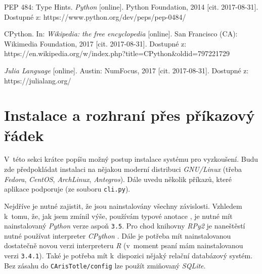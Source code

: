 \documentclass[a4paper,twoside,12pt]{scrbook}
\begin{document}
\begin{thebibliography}{99}
	 PEP 484: Type Hints. \textit{Python} [online]. Python Foundation, 2014 [cit. 2017-08-31]. Dostupné z: https://www.python.org/dev/peps/pep-0484/

	 CPython. In: \textit{Wikipedia: the free encyclopedia} [online]. San Francisco (CA): Wikimedia Foundation, 2017 [cit. 2017-08-31]. Dostupné z: https://en.wikipedia.org/w/index.php?title=CPython\&oldid=797221729

	 \textit{Julia Language} [online]. Austin: NumFocus, 2017 [cit. 2017-08-31]. Dostupné z: https://julialang.org/

\end{thebibliography}


\newpage %
\appendix %



\section*{Instalace a rozhraní přes příkazový řádek}
\label{appendix:installation}

V~této sekci krátce popíšu možný postup instalace systému pro vyzkoušení. Budu zde předpokládat instalaci na nějakou moderní distribuci \textit{GNU/Linux} (třeba \textit{Fedora}, \textit{CentOS}, \textit{ArchLinux}, \textit{Antegros}). Dále uvedu několik příkazů, které aplikace podporuje (ze souboru \texttt{cli.py}).

Nejdříve je nutné zajistit, že jsou nainstalovány všechny závislosti. Vzhledem k~tomu, že, jak jsem zmínil výše, používám typové anotace \cite{PEP484}, je nutné mít nainstalovaný \textit{Python} verze aspoň \texttt{3.5}. Pro chod knihovny \textit{RPy2} je naneštěstí nutné používat interpreter \textit{CPython} \cite{CPython}. Dále je potřeba mít nainstalovanou dostatečně novou verzi interpreteru \textit{R} (v~moment psaní mám nainstalovanou verzi \texttt{3.4.1}). Také je potřeba mít k~dispozici nějaký relační databázový systém. Bez zásahu do \texttt{CArisTotle/config} lze použít zmiňovaný \textit{SQLite}.
\end{document}
